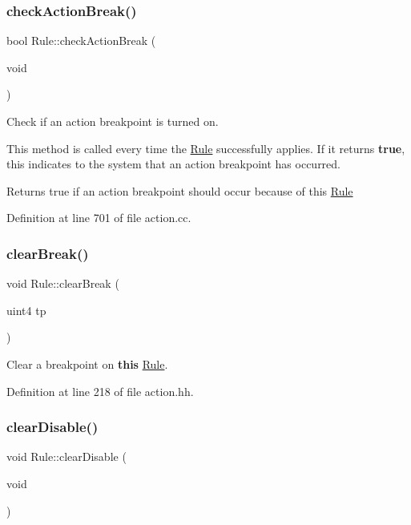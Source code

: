 \subsubsection{\texorpdfstring{checkActionBreak()}{checkActionBreak()}}
{\footnotesize\ttfamily bool Rule\+::check\+Action\+Break (\begin{DoxyParamCaption}\item[{void}]{ }\end{DoxyParamCaption})}



Check if an action breakpoint is turned on. 

This method is called every time the \mbox{\hyperlink{class_rule}{Rule}} successfully applies. If it returns {\bfseries{true}}, this indicates to the system that an action breakpoint has occurred. \begin{DoxyReturn}{Returns}
true if an action breakpoint should occur because of this \mbox{\hyperlink{class_rule}{Rule}} 
\end{DoxyReturn}


Definition at line 701 of file action.\+cc.

\mbox{\label{class_rule_ac77d07cc8f0d8f495253b6d24328bfd1}} 
\subsubsection{\texorpdfstring{clearBreak()}{clearBreak()}}
{\footnotesize\ttfamily void Rule\+::clear\+Break (\begin{DoxyParamCaption}\item[{uint4}]{tp }\end{DoxyParamCaption})\hspace{0.3cm}{\ttfamily [inline]}}



Clear a breakpoint on {\bfseries{this}} \mbox{\hyperlink{class_rule}{Rule}}. 



Definition at line 218 of file action.\+hh.

\mbox{\label{class_rule_aa0da83f1d7cb161bbe27f874d520bab6}} 
\subsubsection{\texorpdfstring{clearDisable()}{clearDisable()}}
{\footnotesize\ttfamily void Rule\+::clear\+Disable (\begin{DoxyParamCaption}\item[{void}]{ }\end{DoxyParamCaption})\hspace{0.3cm}{\ttfamily [inline]}}



